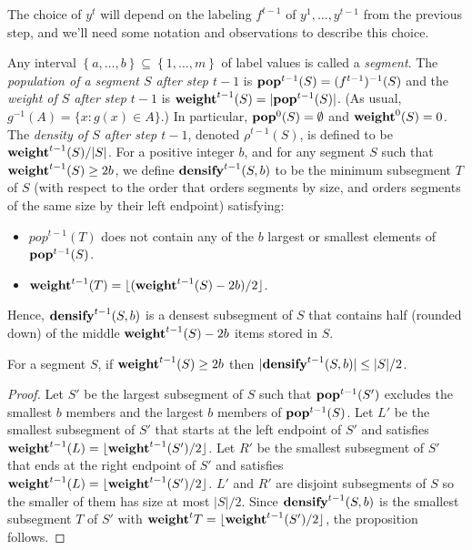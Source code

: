 \documentclass[unicode,review]{siamart1116}
\newcommand{\natInt}[2]{ \left\{ #1, \dotsc, #2 \right\} }
\newcommand{\pop}{{\rm {\bf pop}}}
\newcommand{\weight}{{\rm {\bf weight}}}
\newcommand{\densify}{{\rm {\bf densify}}}
\numberwithin{theorem}{section}
\begin{document}
The choice of $y^t$ will depend on
the labeling $f^{t-1}$ of $y^1,\ldots,y^{t-1}$ from the previous step, and we'll need some notation and
observations to describe this choice.   

Any interval $\natInt{a}{b} \subseteq \natInt{1}{m}$ of label values is called a \emph{segment}.
The \emph{population of a segment $S$ after step $t-1$} is $\pop^{t-1}(S) = (f^{t-1})^{-1}(S)$ and the
\emph{weight of $S$ after step $t-1$} is $\weight^{t-1}(S) = |\pop^{t-1}(S)|$. (As usual, $g^{-1}(A) = \{ x : g(x) \in A \}$.)
In particular,  $\pop^0(S) = \emptyset$ and $\weight^0(S) = 0$.
The \emph{density of $S$ after step $t-1$}, denoted $\rho^{t-1}(S)$, is defined to be $\weight^{t-1}(S) / |S|$. For a positive
integer $b$, and for any segment $S$ such that $\weight^{t-1}(S) \geq 2b$, we define
$\densify^{t-1}(S,b)$ to be the minimum  subsegment $T$ of $S$ (with respect to the order that
orders segments by size, and orders segments of the same size by their left endpoint) satisfying:

\begin{itemize}
\item $pop^{t-1}(T)$ does not contain any of the  $b$ largest or smallest elements of $\pop^{t-1}(S)$.
\item  $\weight^{t-1}(T)=\lfloor (\weight^{t-1}(S)-2b)/2 \rfloor$.
\end{itemize} 

Hence, $\densify^{t-1}(S,b)$ is a densest subsegment of $S$ that contains half (rounded down)  of the middle $\weight^{t-1}(S)-2b$ items
stored in $S$.


\iffalse
These $b$ items on either side of $T$ form the left and right buffers described in \cref{s-1.1}.
\fi
\begin{proposition}
\label{prop:shrinks}
For a segment $S$, if $\weight^{t-1}(S) \geq 2b$ then $|\densify^{t-1}(S,b)| \leq |S|/2$.
\end{proposition}

\begin{proof}
Let $S'$ be the largest subsegment of $S$ such that $\pop^{t-1}(S')$ excludes the
smallest $b$  members and the largest $b$ members of $\pop^{t-1}(S)$.  
Let $L'$ be the smallest subsegment of $S'$ that starts at the left endpoint of $S'$
and satisfies  $\weight^{t-1}(L)=\lfloor \weight^{t-1}(S')/2 \rfloor$.  Let $R'$
 be the smallest subsegment of $S'$ that ends at the right endpoint of $S'$
and satisfies  $\weight^{t-1}(L)=\lfloor \weight^{t-1}(S')/2 \rfloor$.
$L'$ and $R'$ are disjoint subsegments of $S$ so the smaller of them has
size at most $|S|/2$. Since $\densify^{t-1}(S,b)$ is the smallest subsegment $T$ of $S'$ with
$\weight^t{T} = \lfloor \weight^{t-1}(S')/2 \rfloor$, the proposition follows.
\end{proof} 
\end{document}
